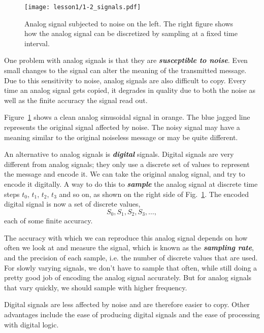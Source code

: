 \begin{figure}[t]
    \centering
    \texttt{[image: lesson1/1-2\_signals.pdf]}
    \caption[Continuous and discrete signals]{Analog signal subjected to noise on the left. The right figure shows how the analog signal can be discretized by sampling at a fixed time interval.}
    \label{fig:1-2_signals}
\end{figure}

One problem with analog signals is that they are \textit{\textbf{susceptible to noise}}.
Even small changes to the signal can alter the meaning of the transmitted message.
Due to this sensitivity to noise, analog signals are also difficult to copy.
Every time an analog signal gets copied, it degrades in quality due to both the noise as well as the finite accuracy the signal read out.

Figure~\ref{fig:1-2_signals} shows a clean analog sinusoidal signal in orange.
The blue jagged line represents the original signal affected by noise.
The noisy signal may have a meaning similar to the original noiseless message or may be quite different.

An alternative to analog signals is \textit{\textbf{digital}} signals.
Digital signals are very different from analog signals; they only use a discrete set of values to represent the message and encode it.
We can take the original analog signal, and try to encode it digitally.
A way to do this to \textit{\textbf{sample}} the analog signal at discrete time steps $t_0$, $t_1$, $t_2$, $t_3$ and so on, as shown on the right side of Fig.~\ref{fig:1-2_signals}.
The encoded digital signal is now a set of discrete values,
\begin{equation}
    S_0, S_1, S_2, S_3, \ldots,
\end{equation}
each of some finite accuracy.

The accuracy with which we can reproduce this analog signal depends on how often we look at and measure the signal, which is known as the \textit{\textbf{sampling rate}}, and the precision of each sample, i.e. the number of discrete values that are used.
For slowly varying signals, we don't have to sample that often, while still doing a pretty good job of encoding the analog signal accurately.
But for analog signals that vary quickly, we should sample with higher frequency.

Digital signals are less affected by noise and are therefore easier to copy.
Other advantages include the ease of producing digital signals and the ease of processing with digital logic.


